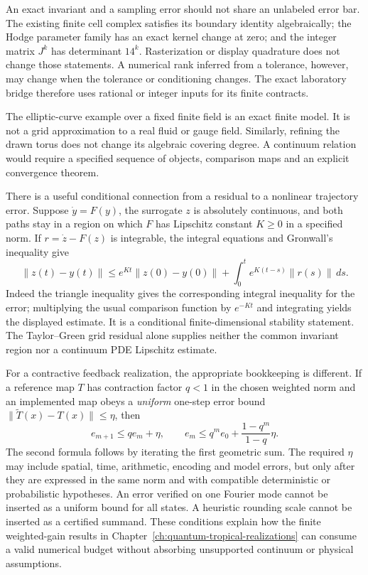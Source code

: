 An exact invariant and a sampling error should not share an unlabeled
error bar. The existing finite cell complex satisfies its boundary
identity algebraically; the Hodge parameter family has an exact kernel
change at zero; and the integer matrix $J^k$ has determinant $14^k$.
Rasterization or display quadrature does not change those statements.
A numerical rank inferred from a tolerance, however, may change when
the tolerance or conditioning changes. The exact laboratory bridge
therefore uses rational or integer inputs for its finite contracts.

The elliptic-curve example over a fixed finite field is an exact finite
model. It is not a grid approximation to a real fluid or gauge field.
Similarly, refining the drawn torus does not change its algebraic
covering degree. A continuum relation would require a specified sequence
of objects, comparison maps and an explicit convergence theorem.

There is a useful conditional connection from a residual to a nonlinear
trajectory error. Suppose $\dot y=F(y)$, the surrogate $z$ is absolutely
continuous, and both paths stay in a region on which $F$ has Lipschitz
constant $K\ge0$ in a specified norm. If
$r=\dot z-F(z)$ is integrable, the integral equations and Gronwall's
inequality give
\[
 \|z(t)-y(t)\|
 \le e^{Kt}\|z(0)-y(0)\|
      +\int_0^t e^{K(t-s)}\|r(s)\|\,ds.
\]
Indeed the triangle inequality gives the corresponding integral
inequality for the error; multiplying the usual comparison function
by $e^{-Kt}$ and integrating yields the displayed estimate.
It is a conditional finite-dimensional stability statement.
The Taylor--Green grid residual alone supplies neither the common
invariant region nor a continuum PDE Lipschitz estimate.

For a contractive feedback realization, the appropriate bookkeeping is
different. If a reference map $T$ has contraction factor $q<1$ in the
chosen weighted norm and an implemented map obeys a \emph{uniform}
one-step error bound $\|\widetilde T(x)-T(x)\|\le\eta$, then
\[
 e_{m+1}\le qe_m+\eta,\qquad
 e_m\le q^m e_0+\frac{1-q^m}{1-q}\eta.
\]
The second formula follows by iterating the first geometric sum.
The required $\eta$ may include spatial, time, arithmetic, encoding
and model errors, but only after they are expressed in the same norm
and with compatible deterministic or probabilistic hypotheses.
An error verified on one Fourier mode cannot be inserted as a uniform
bound for all states. A heuristic rounding scale cannot be inserted
as a certified summand. These conditions explain how the finite
weighted-gain results in Chapter~\ref{ch:quantum-tropical-realizations}
can consume a valid numerical budget without absorbing unsupported
continuum or physical assumptions.


